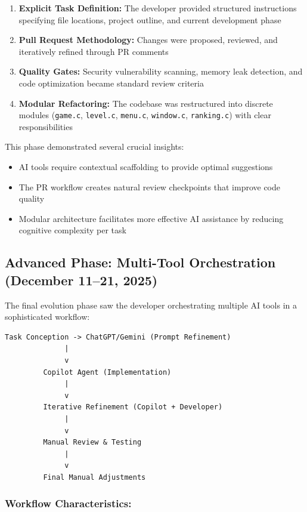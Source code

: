 \documentclass[12pt,a4paper]{article}
\begin{document}
\begin{enumerate}
    \item \textbf{Explicit Task Definition:} The developer provided structured instructions specifying file locations, project outline, and current development phase
    \item \textbf{Pull Request Methodology:} Changes were proposed, reviewed, and iteratively refined through PR comments
    \item \textbf{Quality Gates:} Security vulnerability scanning, memory leak detection, and code optimization became standard review criteria
    \item \textbf{Modular Refactoring:} The codebase was restructured into discrete modules (\texttt{game.c}, \texttt{level.c}, \texttt{menu.c}, \texttt{window.c}, \texttt{ranking.c}) with clear responsibilities
\end{enumerate}

This phase demonstrated several crucial insights:
\begin{itemize}
    \item AI tools require contextual scaffolding to provide optimal suggestions
    \item The PR workflow creates natural review checkpoints that improve code quality
    \item Modular architecture facilitates more effective AI assistance by reducing cognitive complexity per task
\end{itemize}

\subsection{Advanced Phase: Multi-Tool Orchestration (December 11--21, 2025)}

The final evolution phase saw the developer orchestrating multiple AI tools in a sophisticated workflow:

\begin{lstlisting}
Task Conception -> ChatGPT/Gemini (Prompt Refinement)
              |
              v
         Copilot Agent (Implementation)
              |
              v
         Iterative Refinement (Copilot + Developer)
              |
              v
         Manual Review & Testing
              |
              v
         Final Manual Adjustments
\end{lstlisting}

\subsubsection*{Workflow Characteristics:}
\end{document}
